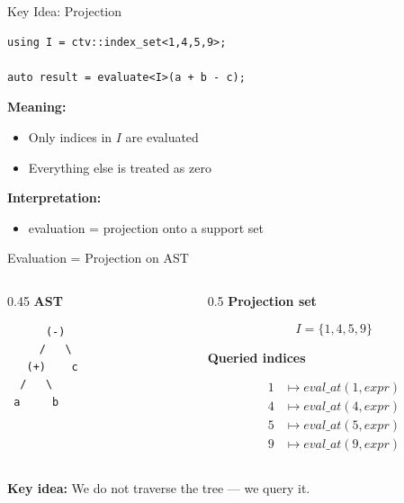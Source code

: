 \documentclass{beamer}
\begin{document}
\begin{frame}[fragile]{Key Idea: Projection}

\begin{lstlisting}
using I = ctv::index_set<1,4,5,9>;

auto result = evaluate<I>(a + b - c);
\end{lstlisting}

\vspace{1em}

\textbf{Meaning:}

\begin{itemize}
\item Only indices in $I$ are evaluated
\item Everything else is treated as zero
\end{itemize}

\vspace{1em}

\textbf{Interpretation:}
\begin{itemize}
\item evaluation = projection onto a support set
\end{itemize}

\end{frame}


\begin{frame}[fragile]{Evaluation = Projection on AST}

\begin{columns}[T]
\begin{column}{0.45\textwidth}
\textbf{AST}

\begin{verbatim}
      (-)
     /   \
   (+)    c
  /   \
 a     b
\end{verbatim}
\end{column}

\begin{column}{0.5\textwidth}
\textbf{Projection set}

\[
I = \{1,4,5,9\}
\]

\vspace{0.5em}

\textbf{Queried indices}

\[
\begin{aligned}
1 &\mapsto eval\_at(1, expr) \\
4 &\mapsto eval\_at(4, expr) \\
5 &\mapsto eval\_at(5, expr) \\
9 &\mapsto eval\_at(9, expr)
\end{aligned}
\]
\end{column}
\end{columns}

\vspace{0.8em}

\textbf{Key idea:} We do not traverse the tree --- we query it.

\end{frame}
\end{document}
